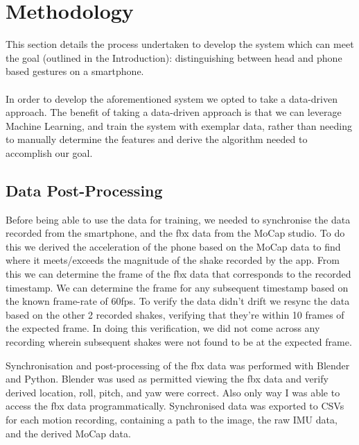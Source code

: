 \section{Methodology} %


This section details the process undertaken to develop the system which can meet the goal (outlined in the Introduction): distinguishing between head and phone based gestures on a smartphone.
\\\\
In order to develop the aforementioned system we opted to take a data-driven approach. The benefit of taking a data-driven approach is that we can leverage Machine Learning, and train the system with exemplar data, rather than needing to manually determine the features and derive the algorithm needed to accomplish our goal.



\subsection{Data Post-Processing}
Before being able to use the data for training, we needed to synchronise the data recorded from the smartphone, and the fbx data from the MoCap studio.
To do this we derived the acceleration of the phone based on the MoCap data to find where it meets/exceeds the magnitude of the shake recorded by the app. From this we can determine the frame of the fbx data that corresponds to the recorded timestamp. We can determine the frame for any subsequent timestamp based on the known frame-rate of 60fps. 
To verify the data didn't drift we resync the data based on the other 2 recorded shakes, verifying that they're within 10 frames of the expected frame. In doing this verification, we did not come across any recording wherein subsequent shakes were not found to be at the expected frame.

Synchronisation and post-processing of the fbx data was performed with Blender and Python.
Blender was used as permitted viewing the fbx data and verify derived location, roll, pitch, and yaw were correct. Also only way I was able to access the fbx data programmatically.
Synchronised data was exported to CSVs for each motion recording, containing a path to the image, the raw IMU data, and the derived MoCap data.

